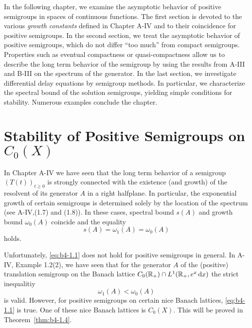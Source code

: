 \setcounter{chapter}{3}
\label{chap:b4}
In the following chapter, we examine the asymptotic behavior of positive semigroups in spaces of continuous functions.
The first section is devoted to the various \emph{growth constants} defined in Chapter A-IV and to their coincidence for positive semigroups.
In the second section, we treat the asymptotic behavior of positive semigroups, which do not differ \enquote{too much} from compact semigroups.
Properties such as eventual compactness or quasi-compactness allow us to describe the long term behavior of the semigroup by using the results from A-III and B-III on the spectrum of the generator.
In the last section, we investigate differential delay equations by semigroup methods. 
In particular, we characterize the spectral bound of the solution semigroups, yielding simple conditions for stability. 
Numerous examples conclude the chapter.

\section{Stability of Positive Semigroups on \texorpdfstring{$C_{0}(X)$}{C(X)}}\label{sec:b4-1}%
\hspace{1cm}{\Large by Frank Neubrander}
\vspace{.5cm}
\newline

In Chapter A-IV we have seen that the long term behavior of a semigroup $(T(t))_{t \geq 0}$ is strongly connected with the existence (and growth) of the resolvent of its generator $A$ in a right halfplane.
In particular, the exponential growth of certain semigroups is determined solely by the location of the spectrum (see A-IV,\;(1.7) and (1.8)).
In these cases, spectral bound $s(A)$ and growth bound $\omega_{0}(A)$ coincide and the equality
\begin{equation}\label{eq:b4-1.1}
   s(A) = \omega_1(A) = \omega_{0}(A)
\end{equation}
holds.

Unfortunately, \eqref{eq:b4-1.1} does not hold for positive semigroups in general.
In A-IV, Example 1.2(2), we have seen that for the generator $A$ of the (positive) translation semigroup on the Banach lattice $C_{0}(\mathbb{R}_+) \cap L^1(\mathbb{R}_+,e^x \mathop{}\!\mathrm{d}{x})$ the strict inequalitiy 
\[
\omega_1(A) < \omega_{0}(A)
\]
is valid.
However, for positive semigroups on certain nice Banach lattices, \eqref{eq:b4-1.1} is true.
One of these nice Banach lattices is $C_{0}(X)$. 
This will be proved in Theorem~\ref{thm:b4-1.4}.

